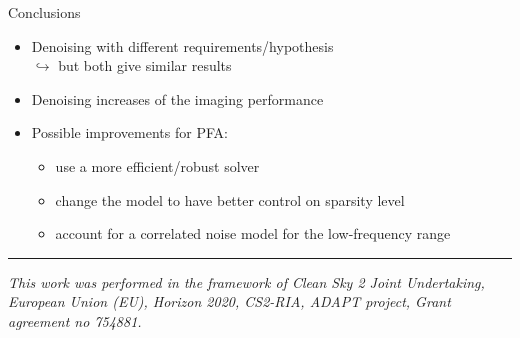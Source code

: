 \documentclass[10pt,xcolor=x11names,compress, show notes]{beamer}%
\begin{document}
\begin{frame}{Conclusions}
	\vspace{2.5em}
\begin{itemize}
	\item Denoising with different requirements/hypothesis\\
	$\hookrightarrow$ but both give similar results\\
	\vspace{2.5em}
        \item Denoising increases of the imaging performance
	\vspace{2.5em}
	\item Possible improvements for PFA:
	\begin{itemize}
        		\item use a more efficient/robust solver
        		\item change the model to have better control on sparsity level%
        		\item account for a correlated noise model for the low-frequency range%
	\end{itemize}
\end{itemize}

\vspace{1cm}

\begin{center}
	\noindent\rule{\textwidth}{0.4pt}
	\textcolor{black!70}{\scriptsize \itshape{ 
	\centering This work was performed in the framework of Clean Sky 2 Joint Undertaking, European Union (EU), Horizon 2020, CS2-RIA, ADAPT project, Grant agreement no 754881.}}
\end{center}
\end{frame}
\end{document}
